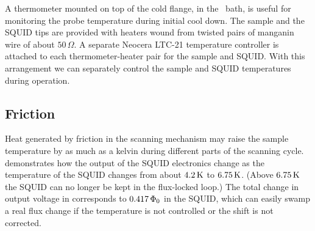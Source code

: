 A thermometer mounted on
top of the cold flange, in the \lhe\ bath, is useful for 
monitoring the probe temperature during initial cool down.
The sample and the SQUID tips are provided with heaters
wound from twisted pairs of manganin wire of about
$50\,\Omega$. A separate Neocera LTC-21
temperature controller\cite{neocera} is attached to each thermometer-heater
pair for the sample and SQUID. With this arrangement 
we can separately control the sample and SQUID temperatures
during operation. 

\subsection{Friction}

\label{sec:squid_vs_temperature}

Heat generated by friction in the scanning mechanism
may raise the sample temperature by as much as a kelvin during
different parts of the scanning cycle. 
 demonstrates how the output of the
SQUID electronics change as the temperature of the SQUID changes
from about $4.2\,\kelvin$ to $6.75\,\kelvin$. 
(Above $6.75\,\kelvin$ the SQUID can no longer be kept in the 
flux-locked loop.)
The total change in output voltage in 
corresponds to $0.417\,\Phinot$ in the SQUID, which
can easily swamp a real flux change if the temperature is not 
controlled or the shift is not corrected. 

